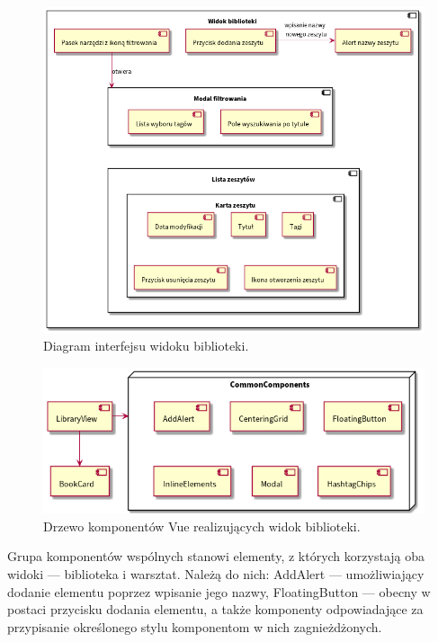 \begin{figure}[H]
	\begin{center}
		\includegraphics[scale=0.5]{media/LibraryInterface.png}
	\end{center}
	\caption{Diagram interfejsu widoku biblioteki.}
	\label{rys:library-interface}
\end{figure}

\begin{figure}[H]
	\begin{center}
		\includegraphics[scale=0.6]{media/LibraryComponents.png}
	\end{center}
	\caption{Drzewo komponentów Vue realizujących widok biblioteki.}
	\label{rys:library-components}
\end{figure}

Grupa komponentów wspólnych stanowi elementy, z których korzystają oba widoki — biblioteka i warsztat. Należą do nich:
AddAlert — umożliwiający dodanie elementu poprzez wpisanie jego nazwy, FloatingButton — obecny w postaci przycisku dodania elementu,
a także komponenty odpowiadające za przypisanie określonego stylu komponentom w nich zagnieżdżonych.

